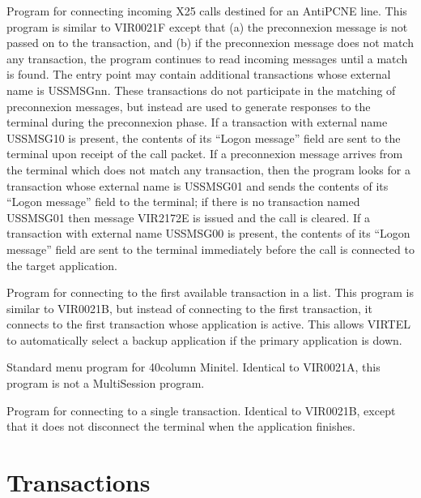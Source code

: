 \documentclass[letterpaper,10pt,english]{sphinxmanual}
\begin{document}
\begin{description}
\sphinxAtStartPar
Program for connecting incoming X25 calls destined for an AntiPCNE line. This program is similar to VIR0021F except that (a) the pre\sphinxhyphen{}connexion message is not passed on to the transaction, and (b) if the pre\sphinxhyphen{}connexion message does not match any transaction, the program continues to read incoming messages until a match is found. The entry point may contain additional transactions whose external name is USSMSGnn. These transactions do not participate in the matching of pre\sphinxhyphen{}connexion messages, but instead are used to generate responses to the terminal during the preconnexion phase. If a transaction with external name USSMSG10 is present, the contents of its “Logon message” field are sent to the terminal upon receipt of the call packet. If a pre\sphinxhyphen{}connexion message arrives from the terminal which does not match any transaction, then the program looks for a transaction whose external name is USSMSG01 and sends the contents of its “Logon message” field to the terminal; if there is no transaction named USSMSG01 then message VIR2172E is issued and the call is cleared. If a transaction with external name USSMSG00 is present, the contents of its “Logon message” field are sent to the terminal immediately before the call is connected to the target application.

\sphinxAtStartPar
Program for connecting to the first available transaction in a list. This program is similar to VIR0021B, but instead of connecting to the first transaction, it connects to the first transaction whose application is active. This allows VIRTEL to automatically select a backup application if the primary application is down.

\sphinxAtStartPar
Standard menu program for 40\sphinxhyphen{}column Minitel. Identical to VIR0021A, this program is not a Multi\sphinxhyphen{}Session program.

\sphinxAtStartPar
Program for connecting to a single transaction. Identical to VIR0021B, except that it does not disconnect the terminal when the application finishes.

\end{description}

\ignorespaces 

\chapter{Transactions}
\label{\detokenize{connectivity_guide:index-112}}\label{\detokenize{connectivity_guide:id60}}
\end{document}

